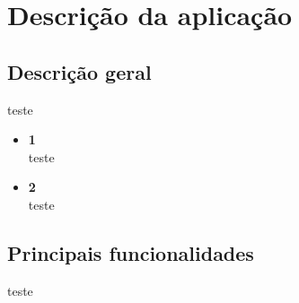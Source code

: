\section{Descrição da aplicação} \label{section: descricao}

\subsection{Descrição geral}
teste

\begin{itemize}

  \item \textbf{1}\\
  teste

  \item \textbf{2}\\
  teste

\end{itemize}


\newpage

\subsection{Principais funcionalidades}
teste
